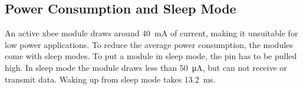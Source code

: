 \subsection{Power Consumption and Sleep Mode}
An active \acs{xbee} module draws around \SI{40}{\milli\ampere} of current, making it unsuitable for low power applications. To reduce the average power consumption, the modules come with sleep modes. To put a module in sleep mode, the  pin has to be pulled high. In sleep mode the module draws less than \SI{50}{\micro\ampere}, but can not receive or transmit data. Waking up from sleep mode takes \SI{13.2}{\milli\second}.




















